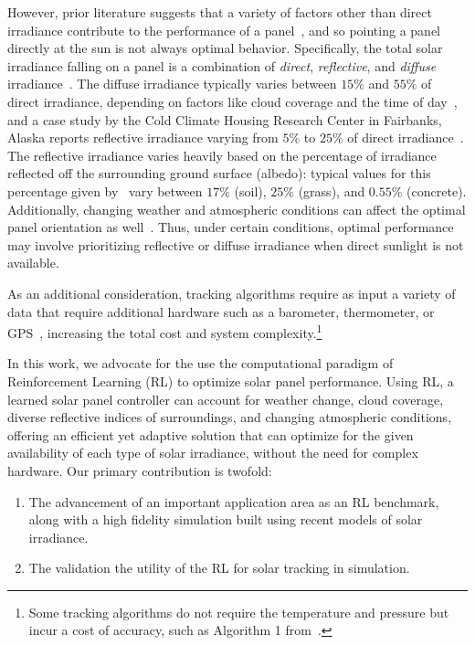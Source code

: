 \documentclass{article}
\begin{document}
However, prior literature suggests that a variety of factors other than direct irradiance contribute to the performance of a panel~\cite{King2001}, and so pointing a panel directly at the sun is not always optimal behavior. Specifically, the total solar irradiance falling on a panel is a combination of {\it direct}, {\it reflective}, and {\it diffuse} irradiance~\cite{Benghanem2011}. The diffuse irradiance typically varies between $15\%$ and $55\%$ of direct irradiance, depending on factors like cloud coverage and the time of day~\cite{peterson1981ratio}, and a case study by the Cold Climate Housing Research Center in Fairbanks, Alaska reports reflective irradiance varying from $5\%$ to $25\%$ of direct irradiance~\cite{colgan2010}. The reflective irradiance varies heavily based on the percentage of irradiance reflected off the surrounding ground surface (albedo): typical values for this percentage given by~\citet{mcevoy2003practical} vary between $17\%$ (soil), $25\%$ (grass), and $0.55\%$ (concrete). Additionally, changing weather and atmospheric conditions can affect the optimal panel orientation as well~\cite{Kelly2009}. Thus, under certain conditions, optimal performance may involve prioritizing reflective or diffuse irradiance when direct sunlight is not available.

As an additional consideration, tracking algorithms require as input a variety of data that require additional hardware such as a barometer, thermometer, or GPS~\cite{Grena2012}, increasing the total cost and system complexity.\footnote{Some tracking algorithms do not require the temperature and pressure but incur a cost of accuracy, such as Algorithm 1 from~\citet{Grena2012}.}

In this work, we advocate for the use the computational paradigm of Reinforcement Learning (RL) to optimize solar panel performance. Using RL, a learned solar panel controller can account for weather change, cloud coverage, diverse reflective indices of surroundings, and changing atmospheric conditions, offering an efficient yet adaptive solution that can optimize for the given availability of each type of solar irradiance, without the need for complex hardware. Our primary contribution is twofold:
\begin{enumerate}
\item The advancement of an important application area as an RL benchmark, along with a high fidelity simulation built using recent models of solar irradiance.
\item The validation the utility of the RL for solar tracking in simulation.
\end{enumerate}
\end{document}
